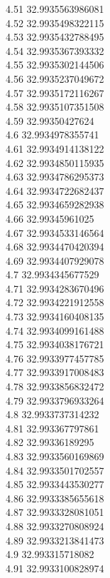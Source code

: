 {4.51	32.9935563986081\\
4.52	32.9935498322115\\
4.53	32.9935432788495\\
4.54	32.9935367393332\\
4.55	32.9935302144506\\
4.56	32.9935237049672\\
4.57	32.9935172116267\\
4.58	32.9935107351508\\
4.59	32.99350427624\\
4.6	32.9934978355741\\
4.61	32.9934914138122\\
4.62	32.9934850115935\\
4.63	32.9934786295373\\
4.64	32.9934722682437\\
4.65	32.9934659282938\\
4.66	32.99345961025\\
4.67	32.9934533146564\\
4.68	32.9934470420394\\
4.69	32.9934407929078\\
4.7	32.9934345677529\\
4.71	32.9934283670496\\
4.72	32.9934221912558\\
4.73	32.9934160408135\\
4.74	32.9934099161488\\
4.75	32.9934038176721\\
4.76	32.9933977457785\\
4.77	32.9933917008483\\
4.78	32.9933856832472\\
4.79	32.9933796933264\\
4.8	32.9933737314232\\
4.81	32.993367797861\\
4.82	32.99336189295\\
4.83	32.9933560169869\\
4.84	32.9933501702557\\
4.85	32.9933443530277\\
4.86	32.9933385655618\\
4.87	32.9933328081051\\
4.88	32.9933270808924\\
4.89	32.9933213841473\\
4.9	32.993315718082\\
4.91	32.9933100828974\\
}
